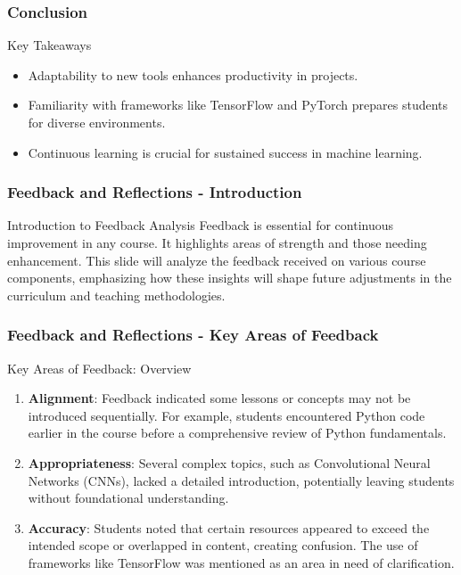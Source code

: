 \documentclass[aspectratio=169]{beamer}
\begin{document}
\begin{frame}
    \frametitle{Conclusion}
    
    \begin{block}{Key Takeaways}
        \begin{itemize}
            \item Adaptability to new tools enhances productivity in projects.
            \item Familiarity with frameworks like TensorFlow and PyTorch prepares students for diverse environments.
            \item Continuous learning is crucial for sustained success in machine learning.
        \end{itemize}
    \end{block}
\end{frame}

\begin{frame}[fragile]
    \frametitle{Feedback and Reflections - Introduction}
    \begin{block}{Introduction to Feedback Analysis}
        Feedback is essential for continuous improvement in any course. It highlights areas of strength and those needing enhancement.
        This slide will analyze the feedback received on various course components, emphasizing how these insights will shape future adjustments in the curriculum and teaching methodologies.
    \end{block}
\end{frame}

\begin{frame}[fragile]
    \frametitle{Feedback and Reflections - Key Areas of Feedback}
    \begin{block}{Key Areas of Feedback: Overview}
        \begin{enumerate}
            \item \textbf{Alignment}:
            Feedback indicated some lessons or concepts may not be introduced sequentially. For example, students encountered Python code earlier in the course before a comprehensive review of Python fundamentals.
            
            \item \textbf{Appropriateness}:
            Several complex topics, such as Convolutional Neural Networks (CNNs), lacked a detailed introduction, potentially leaving students without foundational understanding.
            
            \item \textbf{Accuracy}:
            Students noted that certain resources appeared to exceed the intended scope or overlapped in content, creating confusion. The use of frameworks like TensorFlow was mentioned as an area in need of clarification.
        \end{enumerate}
    \end{block}
\end{frame}
\end{document}
